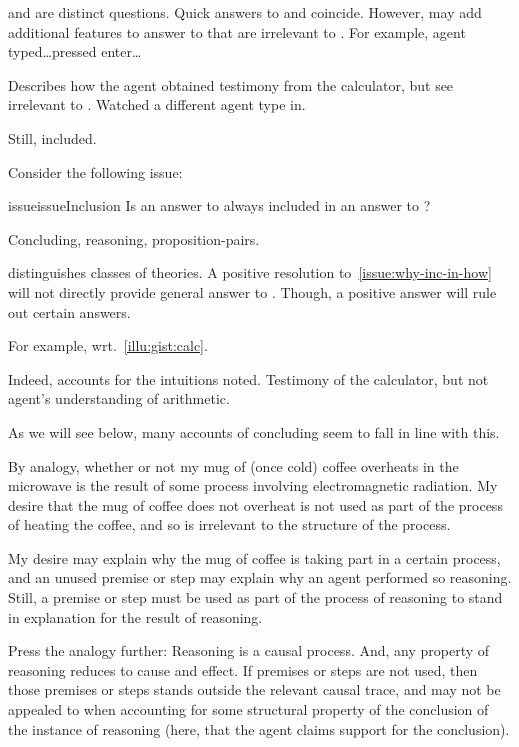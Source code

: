 \begin{note}
  \qWhy{} and \qHow{} are distinct questions.
  Quick answers to \qWhy{} and \qHow{} coincide.
  However, may add additional features to answer to \qHow{} that are irrelevant to \qWhy{}.
  For example, agent typed\dots pressed enter\dots

  Describes how the agent obtained testimony from the calculator, but see irrelevant to \qWhy{}.
  Watched a different agent type in.

  Still, included.
\end{note}

\begin{note}
  Consider the following issue:

  \begin{restatable}[Inclusion]{issue}{issueInclusion}
    \label{issue:why-inc-in-how}
    Is an answer to \qWhy{} always included in an answer to \qHow{}?
  \end{restatable}

  Concluding, reasoning, proposition-pairs.

   distinguishes classes of theories.
  A positive resolution to~\autoref{issue:why-inc-in-how} will not directly provide general answer to \qWhy{}.
  Though, a positive answer will rule out certain answers.

  For example, wrt.~\autoref{illu:gist:calc}.

  Indeed, accounts for the intuitions noted.
  Testimony of the calculator, but not agent's understanding of arithmetic.

  As we will see below, many accounts of concluding seem to fall in line with this.
\end{note}

\begin{note}[Analogy]
  By analogy, whether or not my mug of (once cold) coffee overheats in the microwave is the result of some process involving electromagnetic radiation.
  My desire that the mug of coffee does not overheat is not used as part of the process of heating the coffee, and so is irrelevant to the structure of the process.

  My desire may explain why the mug of coffee is taking part in a certain process, and an unused premise or step may explain why an agent performed so reasoning.
  Still, a premise or step must be used as part of the process of reasoning to stand in explanation for the result of reasoning.

  Press the analogy further: Reasoning is a causal process.
  And, any property of reasoning reduces to cause and effect.
  If premises or steps are not used, then those premises or steps stands outside the relevant causal trace, and may not be appealed to when accounting for some structural property of the conclusion of the instance of reasoning (here, that the agent claims support for the conclusion).
\end{note}

